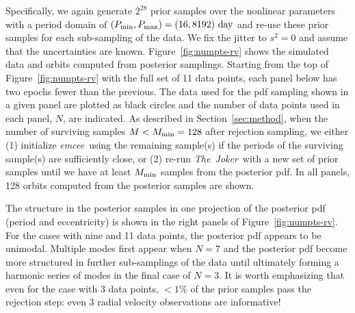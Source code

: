 \documentclass[manuscript, letterpaper]{aastex6}
\newcommand{\project}[1]{\textsl{#1}}
\newcommand{\samplername}{\project{The~Joker}}
\newcommand{\emcee}{\project{emcee}}
\newcommand{\sectionname}{Section}
\newcommand{\figname}{Figure}
\begin{document}
Specifically, we again generate $2^{28}$ prior samples over the nonlinear
parameters with a period domain of $(P_{\rm min}, P_{\rm max}) = (16, 8192)~{\rm
day}$ and re-use these prior samples for each sub-sampling of the data.
We fix the jitter to $s^2 = 0$ and assume that the uncertainties are known.
\figname~\ref{fig:numpts-rv} shows the simulated data and orbits computed from
posterior samplings.
Starting from the top of \figname~\ref{fig:numpts-rv} with the full set of 11
data points, each panel below has two epochs fewer than the previous.
The data used for the pdf sampling shown in a given panel are plotted as black
circles and the number of data points used in each panel, $N$, are indicated.
As described in \sectionname~\ref{sec:method}, when the number of surviving
samples $M < M_{\rm min}=128$ after rejection sampling, we either (1) initialize
\emcee\ using the remaining sample(s) if the periods of the surviving sample(s)
are sufficiently close, or (2) re-run \samplername\ with a new set of prior
samples until we have at least $M_{\rm min}$ samples from the posterior pdf.
In all panels, 128 orbits computed from the posterior samples are shown.

The structure in the posterior samples in one projection of the posterior pdf
(period and eccentricity) is
shown in the right panels of \figname~\ref{fig:numpts-rv}.
For the cases with nine and 11 data points, the posterior pdf appears to be
unimodal.
Multiple modes first appear when $N=7$ and the posterior pdf become more
structured in further sub-samplings of the data until ultimately forming a
harmonic series of modes in the final case of $N=3$.
It is worth emphasizing that even for the case with 3 data points, $<1\%$ of the
prior samples pass the rejection step:
even 3 radial velocity observations are informative!
\end{document}
